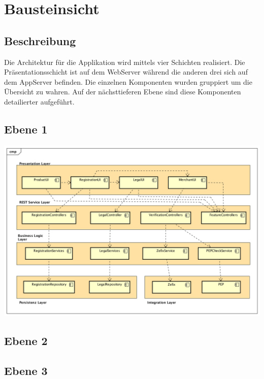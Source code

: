 \graphicspath{{./images/}}

\chapter{Bausteinsicht}

\section{Beschreibung}

Die Architektur für die Applikation wird mittels vier Schichten realisiert. Die Präsentationsschicht ist auf dem WebServer während die anderen drei sich auf dem AppServer befinden. Die einzelnen Komponenten wurden gruppiert um die Übersicht zu wahren. Auf der nächsttieferen Ebene sind diese Komponenten detailierter aufgeführt.


\begin{landscape}
\section{Ebene 1}

\begin{center}
	\includegraphics[scale=0.6]{ComponentLevel1.png}
\end{center}

\end{landscape}
\restoregeometry

\section{Ebene 2}

\section{Ebene 3}